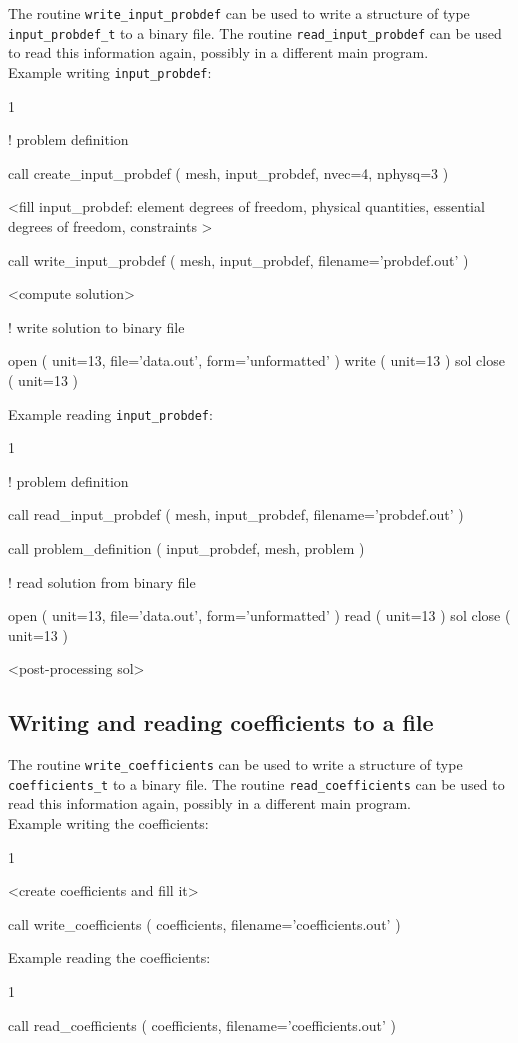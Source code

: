 The routine \texttt{write\_input\_probdef} can be used to write
a structure of type \texttt{input\_probdef\_t} to a binary
file.
The routine \texttt{read\_input\_probdef} can be used to read this
information again, possibly in a different main program.\\
Example writing \texttt{input\_probdef}:
\begin{listing}{1}

! problem definition

  call create_input_probdef ( mesh, input_probdef, nvec=4, nphysq=3 )

  <fill input_probdef: element degrees of freedom, physical quantities,
                       essential degrees of freedom, constraints >

  call write_input_probdef ( mesh, input_probdef, filename='probdef.out' )

  <compute solution>

! write solution to binary file

  open ( unit=13, file='data.out', form='unformatted' )
  write ( unit=13 ) sol%
  close ( unit=13 )

\end{listing}
Example reading \texttt{input\_probdef}:
\begin{listing}{1}

! problem definition

  call read_input_probdef ( mesh, input_probdef, filename='probdef.out' )

  call problem_definition ( input_probdef, mesh, problem )

! read solution from binary file

  open ( unit=13, file='data.out', form='unformatted' )
  read ( unit=13 ) sol%
  close ( unit=13 )

  <post-processing sol>

\end{listing}

\subsection{Writing and reading coefficients to a file}
\label{sec:iocoef}

The routine \texttt{write\_coefficients} can be used to write
a structure of type \texttt{coefficients\_t} to a binary
file.
The routine \texttt{read\_coefficients} can be used to read this
information again, possibly in a different main program.\\
Example writing the coefficients:
\begin{listing}{1}

  <create coefficients and fill it>

  call write_coefficients ( coefficients, filename='coefficients.out' )

\end{listing}
Example reading the coefficients:
\begin{listing}{1}

  call read_coefficients ( coefficients, filename='coefficients.out' )

\end{listing}


